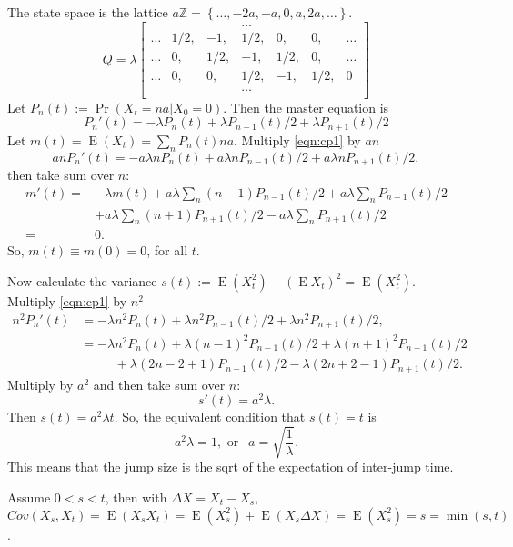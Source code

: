 \documentclass[  11pt]{article}
\newcommand{\p}{ {\Pr}}
\newcommand{\e}{ \operatorname{E}}
\newcommand{\set}[1]{\left\{#1\right\}}
\begin{document}
\begin{ExerciseList}
\Answer
The state space is the lattice $a\mathbb{Z}=\set{
\ldots, -2a,-a, 0,a,2a,\ldots}$.
 $$Q=\lambda \begin{bmatrix}
&&&\ldots&&&\\
\ldots&1/2,&-1,&1/2,&0,&0,&\ldots\\
\ldots&0,&1/2,&-1,&1/2,&0,&\ldots\\
\ldots&0,&0,&1/2,&-1,&1/2,&0\\
&&&\ldots&&\\
\end{bmatrix}
$$
Let $P_n(t):=\p(X_t=na | X_0=0)$. Then the master equation is 
\begin{equation} \label{eqn:cp1}
P_n'(t)= -\lambda P_n(t) + \lambda P_{n-1}(t)/2 +  \lambda P_{n+1}(t)/2
\end{equation}
Let $m(t)=\e (X_t)=\sum_{n} P_n(t) n a $. Multiply \eqref{eqn:cp1} by $an$ 
$$anP_n'(t)= -a\lambda nP_n(t) + a\lambda nP_{n-1}(t)/2 +  a\lambda nP_{n+1}(t)/2,$$
then take sum over $n$:
\begin{equation}
\begin{split}
m'(t)= &-\lambda m(t) +a \lambda \sum_n (n-1)P_{n-1}(t)/2  + a\lambda  \sum_n  P_{n-1}(t)/2 
\\&+ a \lambda   \sum_n  (n+1)P_{n+1}(t)/2 - a\lambda   \sum_n  P_{n+1}(t)/2
\\
=&0.
\end{split}
\end{equation}
So, $m(t)\equiv m(0)=0$, for all $t$.

Now calculate the variance $s(t):=\e (X_t^2)-(\e X_t)^2=\e (X_t^2)$.
Multiply \eqref{eqn:cp1} by $n^2$ 
\begin{equation}
\begin{split}
n^2P_n'(t) & = -\lambda n^2P_n(t) + \lambda n^2P_{n-1}(t)/2 +  \lambda n^2P_{n+1}(t)/2,
\\
& = -\lambda n^2P_n(t) + \lambda (n-1)^2P_{n-1}(t)/2 +  \lambda (n+1)^2P_{n+1}(t)/2
\\
& ~~~\qquad + \lambda (2n -2+1)P_{n-1}(t)/2 -  \lambda (2n+2-1)P_{n+1}(t)/2.
\end{split}
\end{equation}
Multiply by $a^2$  and then take sum over $n$:
$$
s'(t)=a^2 \lambda.
$$
Then $s(t)= a^2 \lambda t$.
So, the equivalent condition that $s(t)=t$ is 
$$a^2 \lambda =1, \mbox{ or }   ~~a =\sqrt{\frac{1}{\lambda}}.$$
This means that the jump size is the sqrt of the expectation of   inter-jump time.

Assume $0<s<t$, then with $\Delta X = X_t-X_s$,
$Cov(X_s,X_t) = \e(X_s X_t) =  \e (X_s^2) + \e (X_s \Delta X) = \e (X_s^2)=s =\min (s,t)$.


\end{ExerciseList}
\end{document}
